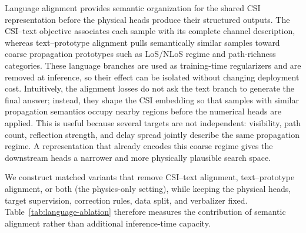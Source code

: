 Language alignment provides semantic organization for the shared CSI representation before the
physical heads produce their structured outputs. The CSI--text objective associates each sample with
its complete channel description, whereas text--prototype alignment pulls semantically similar
samples toward coarse propagation prototypes such as LoS/NLoS regime and path-richness categories.
These language branches are used as training-time regularizers and are removed at inference, so their
effect can be isolated without changing deployment cost. Intuitively, the alignment losses do not ask
the text branch to generate the final answer; instead, they shape the CSI embedding so that samples
with similar propagation semantics occupy nearby regions before the numerical heads are applied. This
is useful because several targets are not independent: visibility, path count, reflection strength,
and delay spread jointly describe the same propagation regime. A representation that already encodes
this coarse regime gives the downstream heads a narrower and more physically plausible search space.

We construct matched variants that remove CSI--text alignment, text--prototype alignment, or both
(the physics-only setting), while keeping the physical heads, target supervision, correction rules,
data split, and verbalizer fixed. Table~\ref{tab:language-ablation} therefore measures the contribution
of semantic alignment rather than additional inference-time capacity.

